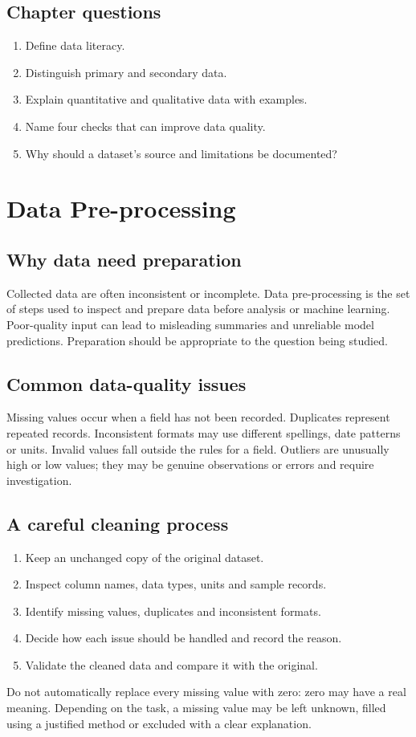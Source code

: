 \documentclass[11pt,openany,oneside]{book}
\begin{document}
\section{Chapter questions}
\begin{enumerate}
\item Define data literacy.
\item Distinguish primary and secondary data.
\item Explain quantitative and qualitative data with examples.
\item Name four checks that can improve data quality.
\item Why should a dataset's source and limitations be documented?
\end{enumerate}

\chapter{Data Pre-processing}
\section{Why data need preparation}
Collected data are often inconsistent or incomplete. Data pre-processing is the set of steps used to inspect and prepare data before analysis or machine learning. Poor-quality input can lead to misleading summaries and unreliable model predictions. Preparation should be appropriate to the question being studied.

\section{Common data-quality issues}
Missing values occur when a field has not been recorded. Duplicates represent repeated records. Inconsistent formats may use different spellings, date patterns or units. Invalid values fall outside the rules for a field. Outliers are unusually high or low values; they may be genuine observations or errors and require investigation.

\section{A careful cleaning process}
\begin{enumerate}
\item Keep an unchanged copy of the original dataset.
\item Inspect column names, data types, units and sample records.
\item Identify missing values, duplicates and inconsistent formats.
\item Decide how each issue should be handled and record the reason.
\item Validate the cleaned data and compare it with the original.
\end{enumerate}
Do not automatically replace every missing value with zero: zero may have a real meaning. Depending on the task, a missing value may be left unknown, filled using a justified method or excluded with a clear explanation.
\end{document}
